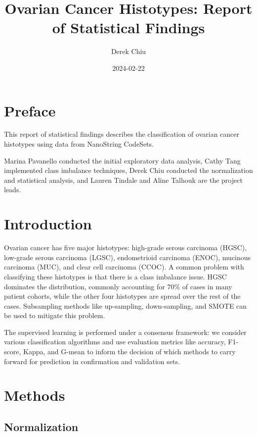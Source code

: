 \documentclass[
]{report}
\title{Ovarian Cancer Histotypes: Report of Statistical Findings}
\author{Derek Chiu}
\date{2024-02-22}
\begin{document}
\maketitle

{
\hypersetup{linkcolor=}
\setcounter{tocdepth}{1}
\tableofcontents
}
\listoffigures
\listoftables
\hypertarget{preface}{%
\chapter*{Preface}\label{preface}}

This report of statistical findings describes the classification of ovarian cancer histotypes using data from NanoString CodeSets.

Marina Pavanello conducted the initial exploratory data analysis, Cathy Tang implemented class imbalance techniques, Derek Chiu conducted the normalization and statistical analysis, and Lauren Tindale and Aline Talhouk are the project leads.

\hypertarget{introduction}{%
\chapter{Introduction}\label{introduction}}

Ovarian cancer has five major histotypes: high-grade serous carcinoma (HGSC), low-grade serous carcinoma (LGSC), endometrioid carcinoma (ENOC), mucinous carcinoma (MUC), and clear cell carcinoma (CCOC). A common problem with classifying these histotypes is that there is a class imbalance issue. HGSC dominates the distribution, commonly accounting for 70\% of cases in many patient cohorts, while the other four histotypes are spread over the rest of the cases. Subsampling methods like up-sampling, down-sampling, and SMOTE can be used to mitigate this problem.

The supervised learning is performed under a consensus framework: we consider various classification algorithms and use evaluation metrics like accuracy, F1-score, Kappa, and G-mean to inform the decision of which methods to carry forward for prediction in confirmation and validation sets.

\hypertarget{methods}{%
\chapter{Methods}\label{methods}}

\hypertarget{normalization}{%
\section{Normalization}\label{normalization}}
\end{document}
